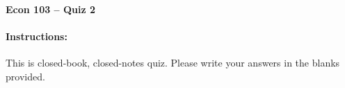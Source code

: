 \documentclass[addpoints,10pt]{exam}
\begin{document}
\thispagestyle{empty}

\noindent \textbf{Econ 103 -- Quiz 2}

\vspace{15pt}
\noindent
{}

\paragraph{Instructions: } This is closed-book, closed-notes quiz. Please write your answers in the blanks provided. 

\vspace{5pt}

\setlength\answerlinelength{2in}
\end{document}
